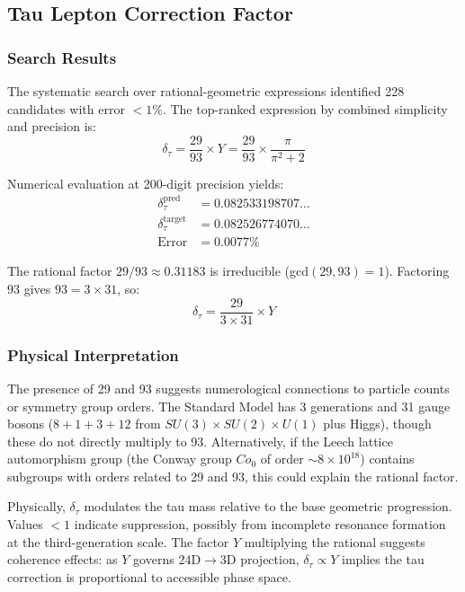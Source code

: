\documentclass[11pt,a4paper]{article}
\begin{document}
\subsection{Tau Lepton Correction Factor}

\subsubsection{Search Results}

The systematic search over rational-geometric expressions identified 228 candidates with error $<1\%$. The top-ranked expression by combined simplicity and precision is:
\begin{equation}
\delta_\tau = \frac{29}{93} \times Y = \frac{29}{93} \times \frac{\pi}{\pi^2 + 2}
\label{eq:delta_tau_solution}
\end{equation}

Numerical evaluation at 200-digit precision yields:
\begin{align}
\delta_\tau^{\text{pred}} &= 0.082533198707\ldots \\
\delta_\tau^{\text{target}} &= 0.082526774070\ldots \\
\text{Error} &= 0.0077\%
\end{align}

The rational factor $29/93 \approx 0.31183$ is irreducible (gcd$(29, 93) = 1$). Factoring 93 gives $93 = 3 \times 31$, so:
\begin{equation}
\delta_\tau = \frac{29}{3 \times 31} \times Y
\end{equation}

\subsubsection{Physical Interpretation}

The presence of 29 and 93 suggests numerological connections to particle counts or symmetry group orders. The Standard Model has 3 generations and 31 gauge bosons ($8 + 1 + 3 + 12$ from $SU(3) \times SU(2) \times U(1)$ plus Higgs), though these do not directly multiply to 93. Alternatively, if the Leech lattice automorphism group (the Conway group $Co_0$ of order $\sim 8 \times 10^{18}$) contains subgroups with orders related to 29 and 93, this could explain the rational factor.

Physically, $\delta_\tau$ modulates the tau mass relative to the base geometric progression. Values $<1$ indicate suppression, possibly from incomplete resonance formation at the third-generation scale. The factor $Y$ multiplying the rational suggests coherence effects: as $Y$ governs 24D$\to$3D projection, $\delta_\tau \propto Y$ implies the tau correction is proportional to accessible phase space.
\end{document}
